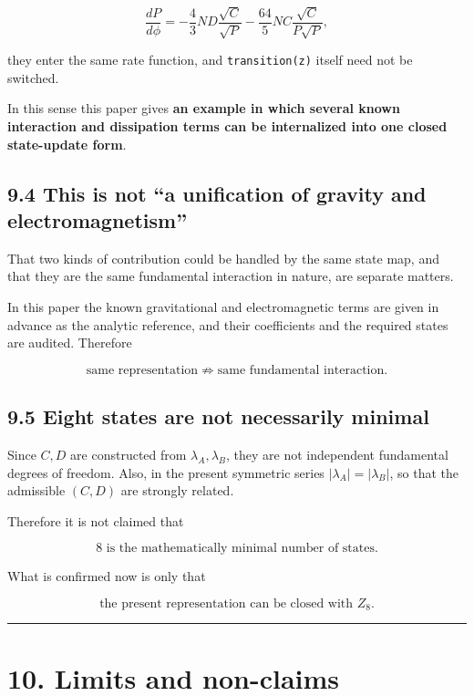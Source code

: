 \documentclass[
  a4paper,
]{article}
\begin{document}
\[
\frac{dP}{d\phi}
=
-\frac{4}{3}ND\frac{\sqrt C}{\sqrt P}
-\frac{64}{5}NC\frac{\sqrt C}{P\sqrt P},
\]

they enter the same rate function, and \texttt{transition(z)} itself
need not be switched.

In this sense this paper gives \textbf{an example in which several known
interaction and dissipation terms can be internalized into one closed
state-update form}.

\subsection{9.4 This is not ``a unification of gravity and
electromagnetism''}\label{this-is-not-a-unification-of-gravity-and-electromagnetism}

That two kinds of contribution could be handled by the same state map,
and that they are the same fundamental interaction in nature, are
separate matters.

In this paper the known gravitational and electromagnetic terms are
given in advance as the analytic reference, and their coefficients and
the required states are audited. Therefore

\[
\boxed{
\text{same representation}
\not\Rightarrow
\text{same fundamental interaction}.
}
\]

\subsection{9.5 Eight states are not necessarily
minimal}\label{eight-states-are-not-necessarily-minimal}

Since \(C,D\) are constructed from \(\lambda_A,\lambda_B\), they are not
independent fundamental degrees of freedom. Also, in the present
symmetric series \(|\lambda_A|=|\lambda_B|\), so that the admissible
\((C,D)\) are strongly related.

Therefore it is not claimed that

\[
\boxed{
8\text{ is the mathematically minimal number of states}.
}
\]

What is confirmed now is only that

\[
\boxed{
\text{the present representation can be closed with }Z_8.
}
\]

\begin{center}\rule{0.5\linewidth}{0.5pt}\end{center}

\section{10. Limits and non-claims}\label{limits-and-non-claims}
\end{document}
